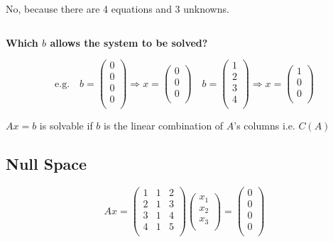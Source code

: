 \documentclass[12pt]{article}
\begin{document}
No, because there are 4 equations and 3 unknowns.

$\>$

\textbf{Which $b$ allows the system to be solved?}

\[
\text{e.g.}
\quad
b=
\left(
    \begin{matrix}
        0\\ 
        0\\
        0\\
        0\\
    \end{matrix}
\right)
\Rightarrow
x=
\left(
    \begin{matrix}
        0\\ 
        0\\
        0\\
    \end{matrix}
\right)
\quad
b=
\left(
    \begin{matrix}
        1\\ 
        2\\
        3\\
        4\\
    \end{matrix}
\right)
\Rightarrow
x=
\left(
    \begin{matrix}
        1\\ 
        0\\
        0\\
    \end{matrix}
\right)
\]

$Ax=b$ is solvable if $b$ is the linear combination of $A$'s columns i.e. $C(A)$

\subsection{Null Space}
\[
Ax=
\left(
    \begin{matrix}
        1 & 1 & 2\\ 
        2 & 1 & 3\\
        3 & 1 & 4\\
        4 & 1 & 5\\
    \end{matrix}
\right)
\left(
    \begin{matrix}
        x_1\\ 
        x_2\\
        x_3\\
    \end{matrix}
\right)
=
\left(
    \begin{matrix}
        0\\ 
        0\\
        0\\
        0\\
    \end{matrix}
\right)
\]
\end{document}
